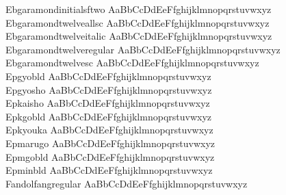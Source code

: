 \begin{tabbing}
Ebgaramondinitialsftwo \> { AaBbCcDdEeFfghijklmnopqrstuvwxyz} \\
Ebgaramondtwelveallsc \> { AaBbCcDdEeFfghijklmnopqrstuvwxyz} \\
Ebgaramondtwelveitalic \> { AaBbCcDdEeFfghijklmnopqrstuvwxyz} \\
Ebgaramondtwelveregular \> { AaBbCcDdEeFfghijklmnopqrstuvwxyz} \\
Ebgaramondtwelvesc \> { AaBbCcDdEeFfghijklmnopqrstuvwxyz} \\
Epgyobld \> { AaBbCcDdEeFfghijklmnopqrstuvwxyz} \\
Epgyosho \> { AaBbCcDdEeFfghijklmnopqrstuvwxyz} \\
Epkaisho \> { AaBbCcDdEeFfghijklmnopqrstuvwxyz} \\
Epkgobld \> { AaBbCcDdEeFfghijklmnopqrstuvwxyz} \\
Epkyouka \> { AaBbCcDdEeFfghijklmnopqrstuvwxyz} \\
Epmarugo \> { AaBbCcDdEeFfghijklmnopqrstuvwxyz} \\
Epmgobld \> { AaBbCcDdEeFfghijklmnopqrstuvwxyz} \\
Epminbld \> { AaBbCcDdEeFfghijklmnopqrstuvwxyz} \\
Fandolfangregular \> { AaBbCcDdEeFfghijklmnopqrstuvwxyz} \\

\end{tabbing}
